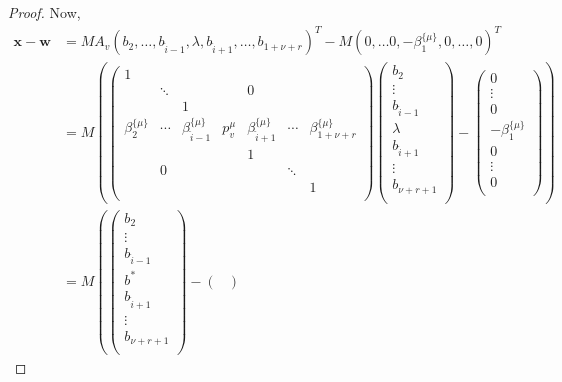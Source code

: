 \documentclass[11pt]{report}
\theoremstyle{definition}
\begin{document}
\begin{proof}
  Now,
  \begin{align*}
    \mathbf{x} - \mathbf{w}
    & = MA_v(b_2, \dots, b_{\hat{i} - 1}, \lambda, b_{\hat{i}+1}, \dots, b_{1+\nu+r})^T -
      M(0, \dots 0, -\beta_1^{\{\mu\}},0, \dots, 0)^T \\
    & = M\left(
      \begin{pmatrix}
        1 &		&		&		&		&		&\\
        & \ddots	& 		&		& 0		& 		&\\
        &		& 1		&		&		&		&\\
        \beta_2^{\{\mu\}}& \cdots & \beta_{\hat{i} - 1}^{\{\mu\}} & p_v^{\mu} & \beta_{\hat{i} + 1}^{\{\mu\}}& \cdots &\beta_{1+ \nu+ r}^{\{\mu\}}\\
        & 		& 		& 		& 1		&		&\\
        & 0		& 		& 		&		& \ddots	&\\
        & 		& 		& 		&		& 		& 1\\
      \end{pmatrix}
    \begin{pmatrix}
      b_2 \\ \vdots \\ b_{\hat{i} -1} \\ \lambda \\ b_{\hat{i} +1} \\ \vdots \\ b_{\nu+r+1} \\
    \end{pmatrix}
    -
    \begin{pmatrix}
      0 \\ \vdots \\ 0 \\ -\beta_1^{\{\mu\}} \\ 0 \\ \vdots \\ 0 \\
    \end{pmatrix}
    \right)\\
    & = M\left(
      \begin{pmatrix}
        b_2 \\ \vdots \\ b_{\hat{i} -1} \\ b^* \\ b_{\hat{i} +1} \\ \vdots \\ b_{\nu+r+1} \\
      \end{pmatrix}
    -
    \begin{pmatrix}

\end{pmatrix}
\end{align*}
\end{proof}
\end{document}
